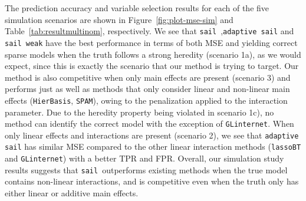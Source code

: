 \documentclass[useAMS,usenatbib,referee]{biom}
\newcommand{\sail}{\texttt{sail}}
\begin{document}
The prediction accuracy and variable selection results for each of the five simulation scenarios are shown in Figure~\ref{fig:plot-mse-sim} and Table~\ref{tab:resultmultinom}, respectively. We see that \sail~,\texttt{adaptive sail} and \texttt{sail weak} have the best performance in terms of both MSE and yielding correct sparse models when the truth follows a strong heredity (scenario 1a), as we would expect, since this is exactly the scenario that our method is trying to target. Our method is also competitive when only main effects are present (scenario 3) and performs just as well as methods that only consider linear and non-linear main effects (\texttt{HierBasis}, \texttt{SPAM}), owing to the penalization applied to the interaction parameter. Due to the heredity property being violated in scenario 1c), no method can identify the correct model with the exception of \texttt{GLinternet}. When only linear effects and interactions are present (scenario 2), we see that \texttt{adaptive sail} has similar MSE compared to the other linear interaction methods (\texttt{lassoBT} and \texttt{GLinternet}) with a better TPR and FPR. Overall, our simulation study results suggests that \sail ~outperforms existing methods when the true model contains non-linear interactions, and is competitive even when the truth only has either linear or additive main effects. 
\end{document}
